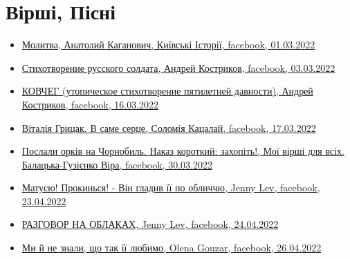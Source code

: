  
 
 
 
 


\section{Вірші, Пісні}
\label{sec:topics.vojna.poezia}




\begin{itemize} %

\item \hyperlink{01_03_2022.fb.fb_group.story_kiev_ua.1.molitva}{%
Молитва, Анатолий Каганович, Київські Історії, facebook, 01.03.2022%
}

\item \hyperlink{03_03_2022.fb.kostrikov_andrej.odessa.1.stih_russkogo_soldata}{%
Стихотворение русского солдата, Андрей Костриков, facebook, 03.03.2022%
}

\item \hyperlink{16_03_2022.fb.kostrikov_andrej.odessa.1.kovcheg}{%
КОВЧЕГ (утопическое стихотворение пятилетней давности), Андрей Костриков, facebook, 16.03.2022%
}

\item \hyperlink{17_03_2022.fb.katsalaj_solomia.1.vitalia_grycak_v_same_serce}{%
Віталія Грицак. В саме серце, Соломія Кацалай, facebook, 17.03.2022%
}

\item \hyperlink{30_03_2022.fb.balatska_vira.gostomel.1.orki_chernobyl}{%
Послали орків на Чорнобиль. Наказ короткий: захопіть!, Мої вірші для всіх. Балацька-Гузієнко Віра, %
facebook, 30.03.2022%
}

\item \hyperlink{23_04_2022.fb.jenny_lev.1.matusju_prokynsja}{%
Матусю! Прокинься! - Він гладив її по обличчю, Jenny Lev, facebook, 23.04.2022%
}

\item \hyperlink{24_04_2022.fb.jenny_lev.1.razgovor_na_oblakah}{%
РАЗГОВОР НА ОБЛАКАХ, Jenny Lev, facebook, 24.04.2022%
}

\item \hyperlink{26_04_2022.fb.gouzar_olena.1.ne_znaly_scho_tak_ii_ljubymo}{%
Ми й не знали, що так її любимо, Olena Gouzar, facebook, 26.04.2022%
}


\end{itemize} %
